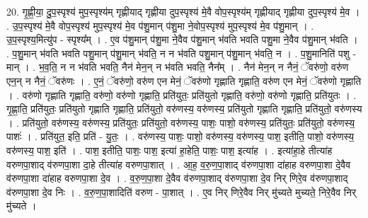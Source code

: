 \documentclass[17pt]{extarticle}
\begin{document}
20. गृ॒ह्णी॒या॒ दु॒प॒स्पृश्य॑ मुप॒स्पृश्य॑म् गृह्णीयाद् गृह्णीया दुप॒स्पृश्य॑ मे॒वै वोप॒स्पृश्य॑म् गृह्णीयाद् गृह्णीया दुप॒स्पृश्य॑ मे॒व । . उ॒प॒स्पृश्य॑ मे॒वै वोप॒स्पृश्य॑ मुप॒स्पृश्य॑ मे॒व प॑शु॒मान् प॑शु॒मा ने॒वोप॒स्पृश्य॑ मुप॒स्पृश्य॑ मे॒व प॑शु॒मान् । . उ॒प॒स्पृश्य॒मित्यु॑प - स्पृश्य᳚म् । . ए॒व प॑शु॒मान् प॑शु॒मा ने॒वैव प॑शु॒मान् भ॑वति भवति पशु॒मा ने॒वैव प॑शु॒मान् भ॑वति । . प॒शु॒मान् भ॑वति भवति पशु॒मान् प॑शु॒मान् भ॑वति॒ न न भ॑वति पशु॒मान् प॑शु॒मान् भ॑वति॒ न । . प॒शु॒मानिति॑ पशु - मान् । . भ॒व॒ति॒ न न भ॑वति भवति॒ नैन॑ मेन॒न् न भ॑वति भवति॒ नैन᳚म् । . नैन॑ मेन॒न् न नैनं॒ ॅवरु॑णो॒ वरु॑ण एन॒न् न नैनं॒ ॅवरु॑णः । . ए॒नं॒ ॅवरु॑णो॒ वरु॑ण एन मेनं॒ ॅवरु॑णो गृह्णाति गृह्णाति॒ वरु॑ण एन मेनं॒ ॅवरु॑णो गृह्णाति । . वरु॑णो गृह्णाति गृह्णाति॒ वरु॑णो॒ वरु॑णो गृह्णाति॒ प्रति॑युतः॒ प्रति॑युतो गृह्णाति॒ वरु॑णो॒ वरु॑णो गृह्णाति॒ प्रति॑युतः । . गृ॒ह्णा॒ति॒ प्रति॑युतः॒ प्रति॑युतो गृह्णाति गृह्णाति॒ प्रति॑युतो॒ वरु॑णस्य॒ वरु॑णस्य॒ प्रति॑युतो गृह्णाति गृह्णाति॒ प्रति॑युतो॒ वरु॑णस्य । . प्रति॑युतो॒ वरु॑णस्य॒ वरु॑णस्य॒ प्रति॑युतः॒ प्रति॑युतो॒ वरु॑णस्य॒ पाशः॒ पाशो॒ वरु॑णस्य॒ प्रति॑युतः॒ प्रति॑युतो॒ वरु॑णस्य॒ पाशः॑ । . प्रति॑युत॒ इति॒ प्रति॑ - यु॒तः॒ । . वरु॑णस्य॒ पाशः॒ पाशो॒ वरु॑णस्य॒ वरु॑णस्य॒ पाश॒ इतीति॒ पाशो॒ वरु॑णस्य॒ वरु॑णस्य॒ पाश॒ इति॑ । . पाश॒ इतीति॒ पाशः॒ पाश॒ इत्या॑ हा॒हेति॒ पाशः॒ पाश॒ इत्या॑ह । . इत्या॑हा॒हे तीत्या॑ह वरुणपा॒शाद् व॑रुणपा॒शा दा॒हे तीत्या॑ह वरुणपा॒शात् । . आ॒ह॒ व॒रु॒ण॒पा॒शाद् व॑रुणपा॒शा दा॑हाह वरुणपा॒शा दे॒वैव व॑रुणपा॒शा दा॑हाह वरुणपा॒शा दे॒व । . व॒रु॒ण॒पा॒शा दे॒वैव व॑रुणपा॒शाद् व॑रुणपा॒शा दे॒व निर् णिरे॒व व॑रुणपा॒शाद् व॑रुणपा॒शा दे॒व निः । . व॒रु॒ण॒पा॒शादिति॑ वरुण - पा॒शात् । . ए॒व निर् णिरे॒वैव निर् मु॑च्यते मुच्यते॒ निरे॒वैव निर् मु॑च्यते । \newline
\end{document}
